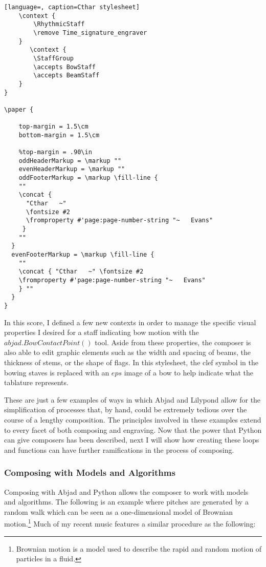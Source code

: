 \begin{lstlisting}[language=, caption=Cthar stylesheet]
    \context {
        \RhythmicStaff
        \remove Time_signature_engraver
    }
       \context {
        \StaffGroup
		\accepts BowStaff
		\accepts BeamStaff
    }
}

\paper {

	top-margin = 1.5\cm
	bottom-margin = 1.5\cm

	%top-margin = .90\in
	oddHeaderMarkup = \markup ""
	evenHeaderMarkup = \markup ""
	oddFooterMarkup = \markup \fill-line {
    ""
    \concat {
      "Cthar   ~"
	  \fontsize #2
	  \fromproperty #'page:page-number-string "~   Evans"
     }
    ""
  }
  evenFooterMarkup = \markup \fill-line {
    ""
	\concat { "Cthar   ~" \fontsize #2
	\fromproperty #'page:page-number-string "~   Evans"
    } ""
  }
}
\end{lstlisting}
\doublespace

In this score, I defined a few new contexts in order to manage the specific visual properties I desired for a staff indicating bow motion with the $abjad.BowContactPoint()$ tool. Aside from these properties, the composer is also able to edit graphic elements such as the width and spacing of beams, the thickness of stems, or the shape of flags. In this stylesheet, the clef symbol in the bowing staves is replaced with an $eps$ image of a bow to help indicate what the tablature represents.

These are just a few examples of ways in which Abjad and Lilypond allow for the simplification of processes that, by hand, could be extremely tedious over the course of a lengthy composition. The principles involved in these examples extend to every facet of both composing and engraving. Now that the power that Python can give composers has been described, next I will show how creating these loops and functions can have further ramifications in the process of composing.

\subsubsection{Composing with Models and Algorithms}

Composing with Abjad and Python allows the composer to work with models and algorithms. The following is an example where pitches are generated by a random walk which can be seen as a one-dimensional model of Brownian motion.\footnote{Brownian motion is a model used to describe the rapid and random motion of particles in a fluid.} Much of my recent music features a similar procedure as the following:

